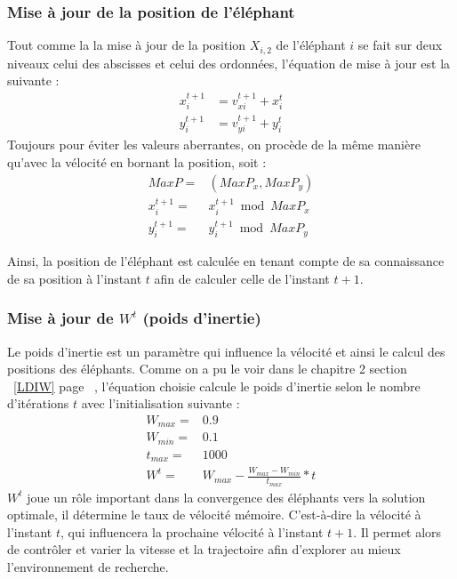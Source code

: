 \subsubsection{Mise à jour de la position de l'éléphant}
Tout comme la \label{vélocité} la mise à jour de la position $X_{i,2}$ de l'éléphant $i$ se fait sur deux niveaux celui des abscisses et celui des ordonnées, l'équation de mise à jour est la suivante : 
\begin{equation}
\begin{split}
x_{i}^{t+1} & = v_{xi}^{t+1} + x_{i}^{t}\\
y_{i}^{t+1} & = v_{yi}^{t+1} + y_{i}^{t}
\end{split}
\end{equation}
Toujours pour éviter les valeurs aberrantes, on procède de la même manière qu'avec la vélocité en bornant la position, soit :
\begin{equation}
\begin{split}
MaxP= &(MaxP_{x},MaxP_{y})\\
x_{i}^{t+1}= & x_{i}^{t+1} \bmod MaxP_{x}\\
y_{i}^{t+1}= & y_{i}^{t+1} \bmod MaxP_{y}
\end{split}
\end{equation} 

Ainsi, la position de l'éléphant est calculée en tenant compte de sa connaissance de sa position à l'instant $t$ afin de calculer celle de l'instant $t+1$.





\subsubsection{Mise à jour de $W^t$ (poids d'inertie)}
Le poids d'inertie est un paramètre qui influence la vélocité et ainsi le calcul des positions des éléphants. Comme on a pu le voir dans le chapitre 2  section ~\ref{LDIW} page ~\pageref{LDIW}, l'équation choisie calcule le poids d'inertie selon le nombre d'itérations $t$
avec l'initialisation suivante :
\begin{equation}
\begin{split}
W_{max}= & 0.9\\
W_{min}= & 0.1\\
t_{max}= & 1000\\
W^{t} = & W_{max} - \frac{W_{max} - W_{min}}{t_{max}} * t
\end{split}
\end{equation}
$W^t$ joue un rôle important dans la convergence des éléphants vers la solution optimale, il détermine le taux de vélocité mémoire. C'est-à-dire la vélocité à l'instant $t$, qui influencera la prochaine vélocité à l'instant $t+1$.
Il permet alors de contrôler et varier la vitesse et la trajectoire afin d'explorer au mieux l'environnement de recherche.\\






